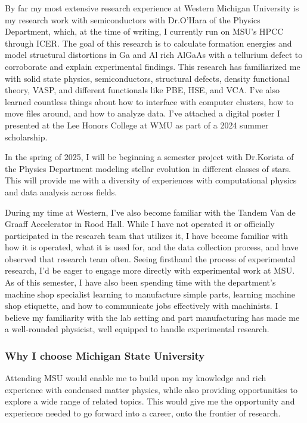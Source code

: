 \documentclass[11pt]{article}
\newcommand{\school}{Michigan State University}
\newcommand{\schoolabbr}{MSU}
\begin{document}
By far my most extensive research experience at Western Michigan University is my research work with semiconductors with Dr.\@ O'Hara of the Physics Department, which, at the time of writing, I currently run on MSU's HPCC through ICER. The goal of this research is to calculate formation energies and model structural distortions in Ga and Al rich AlGaAs with a tellurium defect to corroborate and explain experimental findings. This research has familiarized me with solid state physics, semiconductors, structural defects, density functional theory, VASP, and different functionals like PBE, HSE, and VCA. I've also learned countless things about how to interface with computer clusters, how to move files around, and how to analyze data. I've attached a digital poster I presented at the Lee Honors College at WMU as part of a 2024 summer scholarship.

In the spring of 2025, I will be beginning a semester project with Dr.\@ Korista of the Physics Department modeling stellar evolution in different classes of stars. This will provide me with a diversity of experiences with computational physics and data analysis across fields.

During my time at Western, I've also become familiar with the Tandem Van de Graaff Accelerator in Rood Hall. While I have not operated it or officially participated in the research team that utilizes it, I have become familiar with how it is operated, what it is used for, and the data collection process, and have observed that research team often. Seeing firsthand the process of experimental research, I'd be eager to engage more directly with experimental work at \schoolabbr{}. As of this semester, I have also been spending time with the department's machine shop specialist learning to manufacture simple parts, learning machine shop etiquette, and how to communicate jobs effectively with machinists. I believe my familiarity with the lab setting and part manufacturing has made me a well-rounded physicist, well equipped to handle experimental research.

\subsubsection*{Why I choose \school{}}
Attending \schoolabbr{} would enable me to build upon my knowledge and rich experience with condensed matter physics, while also providing opportunities to explore a wide range of related topics. This would give me the opportunity and experience needed to go forward into a career, onto the frontier of research.
\end{document}
